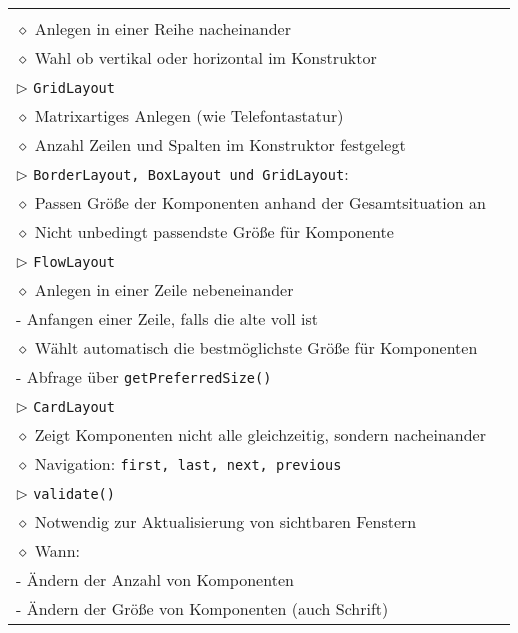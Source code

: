 \begin{longtable}{ | p{} p{} | }
{	$\rhd$ \texttt{BoxLayout} \\ 
	\hspace{0.4cm} $\diamond$ Anlegen in einer Reihe nacheinander \\
	\hspace{0.4cm} $\diamond$ Wahl ob vertikal oder horizontal im Konstruktor \\
	$\rhd$ \texttt{GridLayout} \\
	\hspace{0.4cm} $\diamond$ Matrixartiges Anlegen (wie Telefontastatur) \\
	\hspace{0.4cm} $\diamond$ Anzahl Zeilen und Spalten im Konstruktor festgelegt \\
	$\rhd$ \texttt{BorderLayout, BoxLayout und GridLayout}: \\
	\hspace{0.4cm} $\diamond$ Passen Grö\ss e der Komponenten anhand der Gesamtsituation an \\
	\hspace{0.4cm} $\diamond$ Nicht unbedingt passendste Grö\ss e für Komponente \\
	$\rhd$ \texttt{FlowLayout} \\
	\hspace{0.4cm} $\diamond$ Anlegen in einer Zeile nebeneinander \\
	\hspace{0.6cm} - Anfangen einer Zeile, falls die alte voll ist \\
	\hspace{0.4cm} $\diamond$ Wählt automatisch die bestmöglichste Grö\ss e für Komponenten \\
	\hspace{0.6cm} - Abfrage über \texttt{getPreferredSize()} \\
	$\rhd$ \texttt{CardLayout} \\
	\hspace{0.4cm} $\diamond$ Zeigt Komponenten nicht alle gleichzeitig, sondern nacheinander \\
	\hspace{0.4cm} $\diamond$ Navigation: \texttt{first, last, next, previous} \\
	$\rhd$ \texttt{validate()} \\
	\hspace{0.4cm} $\diamond$ Notwendig zur Aktualisierung von sichtbaren Fenstern \\
	\hspace{0.4cm} $\diamond$ Wann: \\
	\hspace{0.6cm} - Ändern der Anzahl von Komponenten \\
	\hspace{0.6cm} - Ändern der Grö\ss e von Komponenten (auch Schrift)} \\ \hline


\end{longtable}
